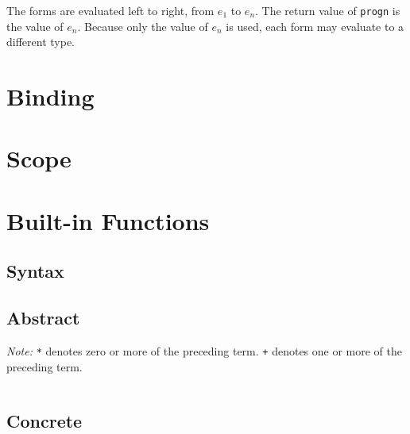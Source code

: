 \documentclass[a4paper, 12pt]{article}
\begin{document}
The forms are evaluated left to right, from $e_1$ to $e_n$. The return value of \texttt{progn} is the value of $e_n$. Because only the value of $e_n$ is used, each form may evaluate to a different type.

\section{Binding}\label{sec:bindingassign}


\section{Scope} \label{sec:scope}


\section{Built-in Functions}


\newpage
\begin{appendices}
    \section{Syntax}\label{sec:syntax}
    \subsection{Abstract}
    \textit{Note:} \texttt{*} denotes zero or more of the preceding term. \texttt{+} denotes one or more of the preceding term.
    \inputminted[fontsize=\footnotesize]{bnf}{grammar_abstract.bnf}

    \subsection{Concrete}
    \inputminted[fontsize=\footnotesize, samepage]{ebnf}{grammar.ebnf}
\end{appendices}
\end{document}
